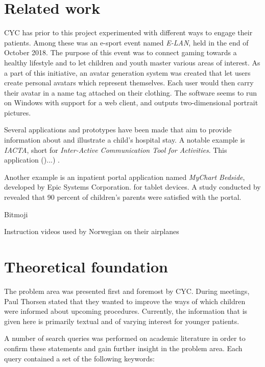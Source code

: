 \section{Related work}
\label{sec:relatedwork}

CYC has prior to this project experimented with different ways to engage their patients. Among these was an e-sport event named \emph{E-LAN}, held in the end of October 2018. The purpose of this event was to connect gaming towards a healthy lifestyle and to let children and youth master various areas of interest. As a part of this initiative, an avatar generation system was created that let users create personal avatars which represent themselves. Each user would then carry their avatar in a name tag attached on their clothing. The software seems to run on Windows with support for a web client, and outputs two-dimensional portrait pictures.

Several applications and prototypes have been made that aim to provide information about and illustrate a child's hospital stay. A notable example is \emph{IACTA}, short for \emph{Inter-Active Communication Tool for Activities}. This application ()...) \parencite{stalberg2018}.

Another example is an inpatient portal application named \emph{MyChart Bedside}, developed by Epic Systems Corporation. for tablet devices. A study conducted by \textcite{kelly2017} revealed that 90 percent of children's parents were satisfied with the portal. 

Bitmoji

Instruction videos used by Norwegian on their airplanes

\section{Theoretical foundation}

The problem area was presented first and foremost by CYC. During meetings, Paul Thorsen stated that they wanted to improve the ways of which children were informed about upcoming procedures. Currently, the information that is given here is primarily textual and of varying interest for younger patients.

A number of search queries was performed on academic literature in order to confirm these statements and gain further insight in the problem area. Each query contained a set of the following keywords:

